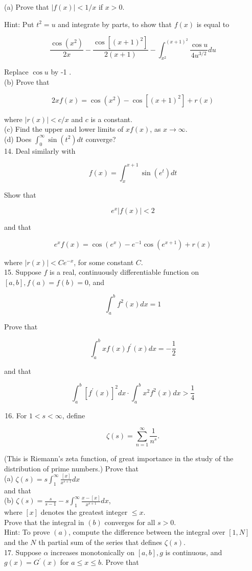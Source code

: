 \documentclass[10pt]{article}
\begin{document}
(a) Prove that $|f(x)|<1 / x$ if $x>0$.

Hint: Put $t^{2}=u$ and integrate by parts, to show that $f(x)$ is equal to

$$
\frac{\cos \left(x^{2}\right)}{2 x}-\frac{\cos \left[(x+1)^{2}\right]}{2(x+1)}-\int_{x^{2}}^{(x+1)^{2}} \frac{\cos u}{4 u^{3 / 2}} d u
$$

Replace $\cos u$ by -1 .\\
(b) Prove that

$$
2 x f(x)=\cos \left(x^{2}\right)-\cos \left[(x+1)^{2}\right]+r(x)
$$

where $|r(x)|<c / x$ and $c$ is a constant.\\
(c) Find the upper and lower limits of $x f(x)$, as $x \rightarrow \infty$.\\
(d) Does $\int_{0}^{\infty} \sin \left(t^{2}\right) d t$ converge?\\
14. Deal similarly with

$$
f(x)=\int_{x}^{x+1} \sin \left(e^{t}\right) d t
$$

Show that

$$
e^{x}|f(x)|<2
$$

and that

$$
e^{x} f(x)=\cos \left(e^{x}\right)-e^{-1} \cos \left(e^{x+1}\right)+r(x)
$$

where $|r(x)|<C e^{-x}$, for some constant $C$.\\
15. Suppose $f$ is a real, continuously differentiable function on $[a, b], f(a)=f(b)=0$, and

$$
\int_{a}^{b} f^{2}(x) d x=1
$$

Prove that

$$
\int_{a}^{b} x f(x) f^{\prime}(x) d x=-\frac{1}{2}
$$

and that

$$
\int_{a}^{b}\left[f^{\prime}(x)\right]^{2} d x \cdot \int_{a}^{b} x^{2} f^{2}(x) d x>\frac{1}{4}
$$

\begin{enumerate}
  \setcounter{enumi}{15}
  \item For $1<s<\infty$, define
\end{enumerate}

$$
\zeta(s)=\sum_{n=1}^{\infty} \frac{1}{n^{s}} .
$$

(This is Riemann's zeta function, of great importance in the study of the distribution of prime numbers.) Prove that\\
(a) $\zeta(s)=s \int_{1}^{\infty} \frac{[x]}{x^{s+1}} d x$\\
and that\\
(b) $\zeta(s)=\frac{s}{s-1}-s \int_{1}^{\infty} \frac{x-[x]}{x^{s+1}} d x$,\\
where $[x]$ denotes the greatest integer $\leq x$.\\
Prove that the integral in $(b)$ converges for all $s>0$.\\
Hint: To prove $(a)$, compute the difference between the integral over $[1, N]$ and the $N$ th partial sum of the series that defines $\zeta(s)$.\\
17. Suppose $\alpha$ increases monotonically on $[a, b], g$ is continuous, and $g(x)=G^{\prime}(x)$ for $a \leq x \leq b$. Prove that
\end{document}
